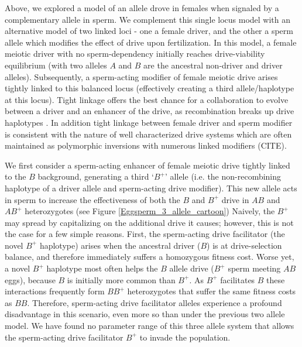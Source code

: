 \documentclass[12pt,letterpaper]{article}
\newcommand{\yb}[1]{{ \color{blue} #1}}
\begin{document}

Above, we explored a model of an allele drove in females when signaled by a complementary allele in sperm.  
We complement this single locus model %
	with  an alternative model of two linked loci - one a female driver, 
	and the other a sperm allele which modifies the effect of drive upon fertilization. 
In this model, a female meiotic driver with no sperm-dependency 
	initially reaches drive-viability equilibrium (with two alleles
	$A$ and $B$ are the ancestral non-driver and driver alleles). 
Subsequently, a sperm-acting modifier of female meiotic drive arises tightly
        linked to this balanced locus (effectively creating a third
        allele/haplotype at this locus). Tight linkage offers the best
        chance for a collaboration to evolve between a driver and
       an enhancer of the drive, as recombination breaks up drive haplotypes \citep{Thomson1974,Charlesworth1978,Haig1991}. 
In addition tight linkage between female driver and sperm modifier is consistent with the nature of well characterized drive systems which are often maintained as polymorphic inversions with numerous linked modifiers (CITE).


We first consider a sperm-acting enhancer of
	female meiotic drive tightly linked to the $B$ background, 
	generating a third `$B^{+}$' allele (i.e. the non-recombining haplotype of a
        driver allele and sperm-acting drive modifier). 
This new allele acts in sperm to increase the effectiveness of both
	the $B$ and  $B^{+}$ drive in $AB$ and $AB^{+}$ heterozygotes (see Figure \ref{Eggsperm_3_allele_cartoon})
Naively, the $B^{+}$ may spread by capitalizing on the additional drive it causes; however,  
	this is not the case for a few simple reasons. 
First, the sperm-acting drive facilitator (the novel $B^{+}$ haplotype) 
	arises when the ancestral driver ($B$) is at drive-selection balance, 
	and therefore immediately suffers a homozygous fitness cost.  
Worse yet, a novel $B^{+}$ haplotype most often helps 
	the $B$  allele drive ($B^+$ sperm meeting $AB$ eggs), because $B$ is initially more common than $B^{+}$. 
As $B^{+}$ facilitates $B$ these interactions frequently form 
	$BB^{+}$ heterozygotes that suffer the same fitness costs as $BB$. 
Therefore, sperm-acting drive facilitator alleles experience a profound disadvantage 
	in this scenario, even more so than under the previous two allele model. 
We have found no parameter range of this
	three allele system that allows the sperm-acting drive facilitator $B^{+}$ to
	invade the population. 
\end{document}

